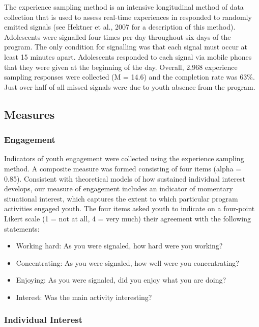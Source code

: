 \documentclass[man]{apa6}
\providecommand{\tightlist}{%
  \setlength{\itemsep}{0pt}\setlength{\parskip}{0pt}}
\theoremstyle{definition}
\theoremstyle{definition}
\theoremstyle{definition}
\theoremstyle{remark}
\begin{document}
The experience sampling method is an intensive longitudinal method of
data collection that is used to assess real-time experiences in
responded to randomly emitted signals (see Hektner et al., 2007 for a
description of this method). Adolescents were signalled four times per
day throughout six days of the program. The only condition for
signalling was that each signal must occur at least 15 minutes apart.
Adolescents responded to each signal via mobile phones that they were
given at the beginning of the day. Overall, 2,968 experience sampling
responses were collected (M = 14.6) and the completion rate was 63\%.
Just over half of all missed signals were due to youth absence from the
program.

\subsection{Measures}\label{measures}

\subsubsection{Engagement}\label{engagement}

Indicators of youth engagement were collected using the experience
sampling method. A composite measure was formed consisting of four items
(alpha = 0.85). Consistent with theoretical models of how sustained
individual interest develops, our measure of engagement includes an
indicator of momentary situational interest, which captures the extent
to which particular program activities engaged youth. The four items
asked youth to indicate on a four-point Likert scale (1 = not at all, 4
= very much) their agreement with the following statements:

\begin{itemize}
\tightlist
\item
  Working hard: As you were signaled, how hard were you working?
\item
  Concentrating: As you were signaled, how well were you concentrating?
\item
  Enjoying: As you were signaled, did you enjoy what you are doing?
\item
  Interest: Was the main activity interesting?
\end{itemize}

\subsubsection{Individual Interest}\label{individual-interest}
\end{document}
